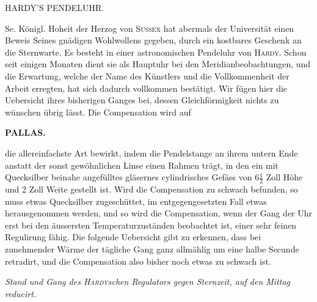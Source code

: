 \par{}\bigskip
\hypertarget{native-458-hardy}{}
\begin{center}{\large HARDY’S PENDELUHR.}\end{center}


Se. Königl. Hoheit der Herzog von \textsc{Sussex} hat abermals der Universität einen Beweis
Seines gnädigen Wohlwollens gegeben, durch ein kostbares Geschenk an die Sternwarte.
Es besteht in einer astronomischen Pendeluhr von \textsc{Hardy}. Schon seit einigen Monaten
dient sie als Hauptuhr bei den Meridianbeobachtungen, und die Erwartung, welche der
Name des Künstlers und die Vollkommenheit der Arbeit erregten, hat sich dadurch
vollkommen bestätigt. Wir fügen hier die Uebersicht ihres bisherigen Ganges bei, dessen
Gleichförmigkeit nichts zu wünschen übrig lässt. Die Compensation wird auf\par
{}
\clearpage
\noindent{}%
%
\parbox[t]{\dimexpr\linewidth-24mm\relax}{\centering\footnotesize\bfseries PALLAS.\par}%
\makebox[12mm][r]{}\par\nobreak\medskip
\noindent die allereinfachste Art bewirkt, indem die Pendelstange an ihrem untern Ende anstatt der
sonst gewöhnlichen Linse einen Rahmen trägt, in den ein mit Quecksilber beinahe
angefülltes gläsernes cylindrisches Gefäss von $6\frac{1}{2}$ Zoll Höhe und 2 Zoll Weite gestellt
ist. Wird die Compensation zu schwach befunden, so muss etwas Quecksilber
zugeschüttet, im entgegengesetzten Fall etwas herausgenommen werden, und so wird die
Compensation, wenn der Gang der Uhr erst bei den äussersten Temperaturzuständen
beobachtet ist, einer sehr feinen Regulirung fähig. Die folgende Uebersicht gibt zu
erkennen, dass bei zunehmender Wärme der tägliche Gang ganz allmählig um eine halbe
Secunde retradirt,
 und die Compensation also bisher noch etwas zu schwach ist.

\begin{center}
\emph{Stand und Gang des \textup{\textsc{Hardy}}schen Regulators gegen Sternzeit, auf den Mittag reducirt.}
\end{center}

